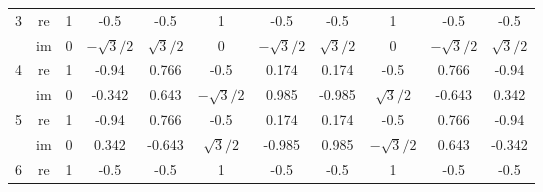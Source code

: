 \begin{center}
\begin{tabular}{| c c c c c c c c c c c |}
		\hline\hline
		\multirow{2}{*}{3}         & re                           & 1                            & -0.5                         & -0.5                         & 1                            & -0.5                         & -0.5                         & 1                            & -0.5                          & -0.5          \\
		                           & im                           & 0                            & $-\sqrt{3}/2$                & $\sqrt{3}/2$                 & 0                            & $-\sqrt{3}/2$                & $\sqrt{3}/2$                 & 0                            & $-\sqrt{3}/2$                 & $\sqrt{3}/2$  \\
		\hline\hline
		\multirow{2}{*}{4}         & re                           & 1                            & -0.94                        & 0.766                        & -0.5                         & 0.174                        & 0.174                        & -0.5                         & 0.766                         & -0.94         \\
		                           & im                           & 0                            & -0.342                       & 0.643                        & $-\sqrt{3}/2$                & 0.985                        & -0.985                       & $\sqrt{3}/2$                 & -0.643                        & 0.342         \\
		\hline\hline
		\multirow{2}{*}{5}         & re                           & 1                            & -0.94                        & 0.766                        & -0.5                         & 0.174                        & 0.174                        & -0.5                         & 0.766                         & -0.94         \\
		                           & im                           & 0                            & 0.342                        & -0.643                       & $\sqrt{3}/2$                 & -0.985                       & 0.985                        & $-\sqrt{3}/2$                & 0.643                         & -0.342        \\
		\hline\hline
		\multirow{2}{*}{6}         & re                           & 1                            & -0.5                         & -0.5                         & 1                            & -0.5                         & -0.5                         & 1                            & -0.5                          & -0.5          \\

\end{tabular}
\end{center}
